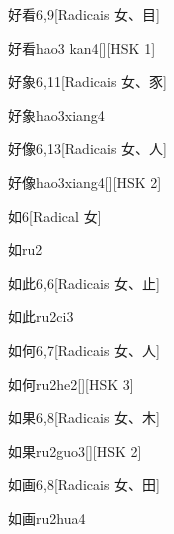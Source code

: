 \begin{entry}{好看}{6,9}[Radicais ⼥、⽬]
  \begin{phonetics}{好看}{hao3 kan4}[][HSK 1]
  \end{phonetics}
\end{entry}

\begin{entry}{好象}{6,11}[Radicais ⼥、⾗]
  \begin{phonetics}{好象}{hao3xiang4}
  \end{phonetics}
\end{entry}

\begin{entry}{好像}{6,13}[Radicais ⼥、⼈]
  \begin{phonetics}{好像}{hao3xiang4}[][HSK 2]
  \end{phonetics}
\end{entry}

\begin{entry}{如}{6}[Radical ⼥]
  \begin{phonetics}{如}{ru2}
  \end{phonetics}
\end{entry}

\begin{entry}{如此}{6,6}[Radicais ⼥、⽌]
  \begin{phonetics}{如此}{ru2ci3}
  \end{phonetics}
\end{entry}

\begin{entry}{如何}{6,7}[Radicais ⼥、⼈]
  \begin{phonetics}{如何}{ru2he2}[][HSK 3]
  \end{phonetics}
\end{entry}

\begin{entry}{如果}{6,8}[Radicais ⼥、⽊]
  \begin{phonetics}{如果}{ru2guo3}[][HSK 2]
  \end{phonetics}
\end{entry}

\begin{entry}{如画}{6,8}[Radicais ⼥、⽥]
  \begin{phonetics}{如画}{ru2hua4}
  \end{phonetics}
\end{entry}

